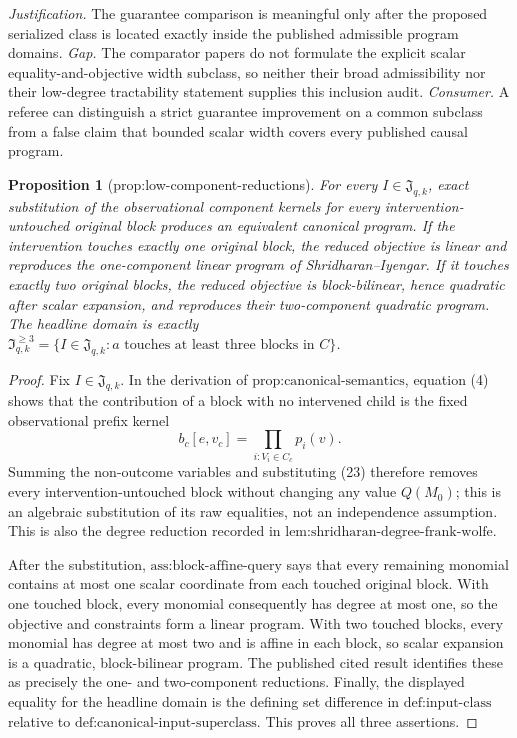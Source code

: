 \documentclass{article}
\newtheorem{proposition}{Proposition}
\begin{document}
\par\smallskip\noindent \textit{Justification.} The guarantee comparison is meaningful only after the proposed serialized class is located exactly inside the published admissible program domains. \textit{Gap.} The comparator papers do not formulate the explicit scalar equality-and-objective width subclass, so neither their broad admissibility nor their low-degree tractability statement supplies this inclusion audit. \textit{Consumer.} A referee can distinguish a strict guarantee improvement on a common subclass from a false claim that bounded scalar width covers every published causal program.

\begin{proposition}[prop:low-component-reductions]\label{prop:low-component-reductions}
For every \(I\in\mathfrak J_{q,k}\), exact substitution of the observational component kernels for every intervention-untouched original block produces an equivalent canonical program. If the intervention touches exactly one original block, the reduced objective is linear and reproduces the one-component linear program of Shridharan--Iyengar. If it touches exactly two original blocks, the reduced objective is block-bilinear, hence quadratic after scalar expansion, and reproduces their two-component quadratic program. The headline domain is exactly \(\mathfrak I_{q,k}^{\ge3}=\{I\in\mathfrak J_{q,k}:a\text{ touches at least three blocks in }C\}\).
\end{proposition}
\begin{proof}
Fix \(I\in\mathfrak J_{q,k}\).  In the derivation of \(\text{prop:canonical-semantics}\), equation (4) shows that the contribution of a block with no intervened child is the fixed observational prefix kernel
\[
b_c[e,v_c]=\prod_{i:V_i\in C_c}p_i(v). \tag{23}
\]
Summing the non-outcome variables and substituting (23) therefore removes every intervention-untouched block without changing any value \(Q(M_0)\); this is an algebraic substitution of its raw equalities, not an independence assumption.  This is also the degree reduction recorded in \(\text{lem:shridharan-degree-frank-wolfe}\).

After the substitution, \(\text{ass:block-affine-query}\) says that every remaining monomial contains at most one scalar coordinate from each touched original block.  With one touched block, every monomial consequently has degree at most one, so the objective and constraints form a linear program.  With two touched blocks, every monomial has degree at most two and is affine in each block, so scalar expansion is a quadratic, block-bilinear program.  The published cited result identifies these as precisely the one- and two-component reductions.  Finally, the displayed equality for the headline domain is the defining set difference in \(\text{def:input-class}\) relative to \(\text{def:canonical-input-superclass}\).  This proves all three assertions.
\end{proof}
\end{document}
